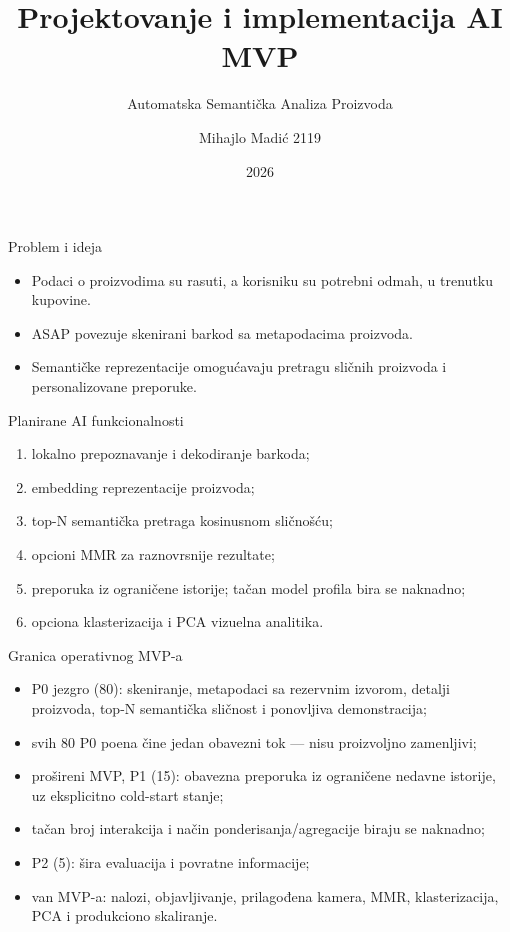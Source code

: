 \documentclass[aspectratio=169,11pt]{beamer}
\title{Projektovanje i implementacija AI MVP}
\subtitle[ASAP]{Automatska Semantička Analiza Proizvoda}
\author[Mihajlo Madić 2119]{Mihajlo Madić 2119}
\institute[Inteligentni sistemi]{Inteligentni sistemi}
\date{2026}
\begin{document}
\begin{frame}
  \titlepage
\end{frame}

\begin{frame}{Problem i ideja}
  \begin{itemize}
    \item Podaci o proizvodima su rasuti, a korisniku su potrebni odmah, u trenutku kupovine.
    \item ASAP povezuje skenirani barkod sa metapodacima proizvoda.
    \item Semantičke reprezentacije omogućavaju pretragu sličnih proizvoda i personalizovane preporuke.
  \end{itemize}
\end{frame}

\begin{frame}{Planirane AI funkcionalnosti}
  \begin{enumerate}
    \item lokalno prepoznavanje i dekodiranje barkoda;
    \item embedding reprezentacije proizvoda;
    \item top-N semantička pretraga kosinusnom sličnošću;
    \item opcioni MMR za raznovrsnije rezultate;
    \item preporuka iz ograničene istorije; tačan model profila bira se naknadno;
    \item opciona klasterizacija i PCA vizuelna analitika.
  \end{enumerate}
\end{frame}

\begin{frame}{Granica operativnog MVP-a}
  \begin{itemize}
    \item P0 jezgro (80): skeniranje, metapodaci sa rezervnim izvorom, detalji proizvoda, top-N semantička sličnost i ponovljiva demonstracija;
    \item svih 80 P0 poena čine jedan obavezni tok --- nisu proizvoljno zamenljivi;
    \item prošireni MVP, P1 (15): obavezna preporuka iz ograničene nedavne istorije, uz eksplicitno cold-start stanje;
    \item tačan broj interakcija i način ponderisanja/agregacije biraju se naknadno;
    \item P2 (5): šira evaluacija i povratne informacije;
    \item van MVP-a: nalozi, objavljivanje, prilagođena kamera, MMR, klasterizacija, PCA i produkciono skaliranje.
  \end{itemize}
\end{frame}
\end{document}
